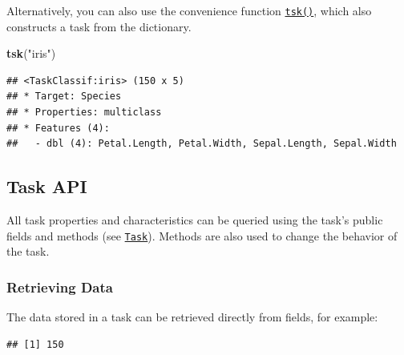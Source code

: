 \documentclass[]{scrbook}
\newenvironment{Shaded}{\begin{snugshade}}{\end{snugshade}}
\newcommand{\KeywordTok}[1]{\textcolor[rgb]{0.13,0.29,0.53}{\textbf{#1}}}
\newcommand{\NormalTok}[1]{#1}
\newcommand{\OperatorTok}[1]{\textcolor[rgb]{0.81,0.36,0.00}{\textbf{#1}}}
\newcommand{\StringTok}[1]{\textcolor[rgb]{0.31,0.60,0.02}{#1}}
\renewenvironment{Shaded} {\begin{snugshade}\small} {\end{snugshade}}
\begin{document}
Alternatively, you can also use the convenience function \href{https://mlr3.mlr-org.com/reference/mlr_sugar.html}{\texttt{tsk()}}, which also constructs a task from the dictionary.

\begin{Shaded}
\begin{Highlighting}[]
\KeywordTok{tsk}\NormalTok{(}\StringTok{"iris"}\NormalTok{)}
\end{Highlighting}
\end{Shaded}

\begin{verbatim}
## <TaskClassif:iris> (150 x 5)
## * Target: Species
## * Properties: multiclass
## * Features (4):
##   - dbl (4): Petal.Length, Petal.Width, Sepal.Length, Sepal.Width
\end{verbatim}

\hypertarget{tasks-api}{%
\subsection{Task API}\label{tasks-api}}

All task properties and characteristics can be queried using the task's public fields and methods (see \href{https://mlr3.mlr-org.com/reference/Task.html}{\texttt{Task}}).
Methods are also used to change the behavior of the task.

\hypertarget{tasks-retrieving}{%
\subsubsection{Retrieving Data}\label{tasks-retrieving}}

The data stored in a task can be retrieved directly from fields, for example:

\begin{Shaded}
\end{Shaded}

\begin{verbatim}
## [1] 150
\end{verbatim}

\begin{Shaded}
\end{Shaded}
\end{document}
